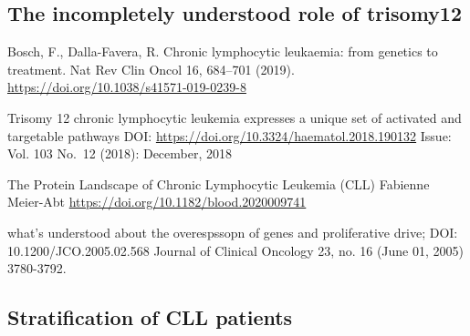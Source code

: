 \documentclass[11pt, a4paper, twosided]{book}
\begin{document}
\hypertarget{intro-trisomy12}{%
\subsection{The incompletely understood role of trisomy12}\label{intro-trisomy12}}

Bosch, F., Dalla-Favera, R. Chronic lymphocytic leukaemia: from genetics to treatment. Nat Rev Clin Oncol 16, 684--701 (2019). \url{https://doi.org/10.1038/s41571-019-0239-8}

Trisomy 12 chronic lymphocytic leukemia expresses a unique set of activated and targetable pathways
DOI: \url{https://doi.org/10.3324/haematol.2018.190132}
Issue: Vol. 103 No.~12 (2018): December, 2018

The Protein Landscape of Chronic Lymphocytic Leukemia (CLL)
Fabienne Meier-Abt \url{https://doi.org/10.1182/blood.2020009741}

what's understood about the overespssopn of genes and proliferative drive;
DOI: 10.1200/JCO.2005.02.568 Journal of Clinical Oncology 23, no. 16 (June 01, 2005) 3780-3792.

\hypertarget{stratification-of-cll-patients}{%
\subsection{Stratification of CLL patients}\label{stratification-of-cll-patients}}
\end{document}
